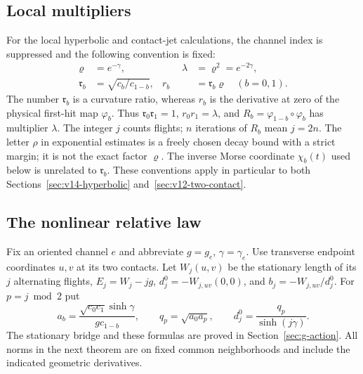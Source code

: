 \subsection{Local multipliers}
\label{sec:v15-notation}
For the local hyperbolic and contact-jet calculations, the channel
index is suppressed and the following convention is fixed:
\begin{equation}\label{eq:v15-multiplier-convention}
 \begin{aligned}
 \varrho&=e^{-\gamma},&\qquad \lambda&=\varrho^2=e^{-2\gamma},\\
 \mathfrak r_b&=\sqrt{c_b/c_{1-b}},&
 r_b&=\mathfrak r_b\varrho\quad(b=0,1).
 \end{aligned}
\end{equation}
The number $\mathfrak r_b$ is a curvature ratio, whereas $r_b$ is
the derivative at zero of the physical first-hit map $\varphi_b$.
Thus $\mathfrak r_0\mathfrak r_1=1$, $r_0r_1=\lambda$, and
$R_b=\varphi_{1-b}\circ\varphi_b$ has multiplier $\lambda$.
The integer $j$ counts flights; $n$ iterations of $R_b$ mean $j=2n$.
The letter $\rho$ in exponential estimates is a freely chosen decay
bound with a strict margin; it is not the exact factor $\varrho$.
The inverse Morse coordinate $\chi_b(t)$ used below is unrelated to
$\mathfrak r_b$. These conventions apply in particular to both
Sections~\ref{sec:v14-hyperbolic} and~\ref{sec:v12-two-contact}.

\subsection{The nonlinear relative law}
Fix an oriented channel $e$ and abbreviate $g=g_e$, $\gamma=\gamma_e$.
Use transverse endpoint coordinates $u,v$ at its two contacts. Let
$W_j(u,v)$ be the stationary length of its $j$ alternating flights,
$E_j=W_j-jg$, $d_j^0=-W_{j,uv}(0,0)$, and $b_j=-W_{j,uv}/d_j^0$.
For $p=j\bmod2$ put
\[
 a_b=\frac{\sqrt{c_0c_1}\sinh\gamma}{g c_{1-b}},\qquad
 q_p=\sqrt{a_0a_p},\qquad d_j^0=\frac{q_p}{\sinh(j\gamma)}.
\]
The stationary bridge and these formulas are proved in
Section~\ref{sec:g-action}. All norms in the next theorem are on fixed
common neighborhoods and include the indicated geometric derivatives.

